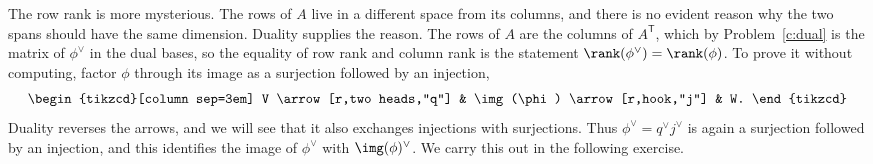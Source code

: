 \documentclass[12pt,reqno]{amsart}
\begin{document}
The row rank is more mysterious. The rows of $A$ live in a different space from its columns, and there is no evident reason why the two spans should have the same dimension. Duality supplies the reason. The rows of $A$ are the columns of $A^{\mathsf T}$, which by Problem~\ref{c:dual} is the matrix of $\phi^{\vee}$ in the dual bases, so the equality of row rank and column rank is the statement $\rank(\phi^{\vee})=\rank(\phi)$. To prove it without computing, factor $\phi$ through its image as a surjection followed by an injection,
\[
\begin{tikzcd}[column sep=3em]
V \arrow[r,two heads,"q"] & \img(\phi) \arrow[r,hook,"j"] & W.
\end{tikzcd}
\]
Duality reverses the arrows, and we will see that it also exchanges injections with surjections. Thus $\phi^{\vee}=q^{\vee}j^{\vee}$ is again a surjection followed by an injection, and this identifies the image of $\phi^{\vee}$ with $\img(\phi)^{\vee}$. We carry this out in the following exercise.

\hrulefill
\end{document}
